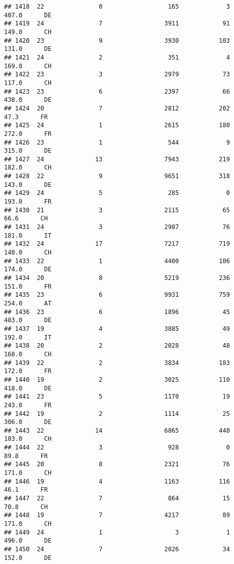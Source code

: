 \documentclass[
]{article}
\begin{document}
\begin{verbatim}
## 1418  22               0                  165             3    407.0      DE
## 1419  24               7                 3911            91    149.0      CH
## 1420  23               9                 3930           103    131.0      DE
## 1421  24               2                  351             4    169.0      CH
## 1422  23               3                 2979            73    117.0      CH
## 1423  23               6                 2397            66    438.0      DE
## 1424  20               7                 2812           202     47.3      FR
## 1425  24               1                 2615           180    272.0      FR
## 1426  23               1                  544             9    315.0      DE
## 1427  24              13                 7943           219    182.0      CH
## 1428  22               9                 9651           318    143.0      DE
## 1429  24               5                  285             0    193.0      FR
## 1430  21               3                 2115            65     66.6      CH
## 1431  24               3                 2987            76    181.0      IT
## 1432  24              17                 7217           719    140.0      CH
## 1433  22               1                 4400           106    174.0      DE
## 1434  20               8                 5219           236    151.0      FR
## 1435  23               6                 9931           759    254.0      AT
## 1436  23               6                 1896            45    483.0      DE
## 1437  19               4                 3885            49    192.0      IT
## 1438  20               2                 2028            48    168.0      CH
## 1439  22               2                 3834           183    172.0      FR
## 1440  19               2                 3025           110    418.0      DE
## 1441  23               5                 1170            19    243.0      FR
## 1442  19               2                 1114            25    306.0      DE
## 1443  22              14                 6865           448    103.0      CH
## 1444  22               3                  928             0     89.8      FR
## 1445  20               8                 2321            76    171.0      CH
## 1446  19               4                 1163           116     46.1      FR
## 1447  22               7                  864            15     70.8      CH
## 1448  19               7                 4217            89    171.0      CH
## 1449  24               1                    3             1    496.0      DE
## 1450  24               7                 2026            34    152.0      DE

\end{verbatim}
\end{document}
